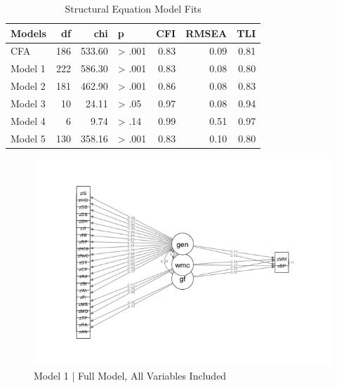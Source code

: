 \documentclass[12pt,]{book}
\begin{document}
\begin{table}[t]

\caption{\label{tab:ModelFits}Structural Equation Model Fits}
\centering
\begin{tabular}{lrrlrrr}
\toprule
Models & df & chi & p & CFI & RMSEA & TLI\\
\midrule
CFA & 186 & 533.60 & > .001 & 0.83 & 0.09 & 0.81\\
Model 1 & 222 & 586.30 & > .001 & 0.83 & 0.08 & 0.80\\
Model 2 & 181 & 462.90 & > .001 & 0.86 & 0.08 & 0.83\\
Model 3 & 10 & 24.11 & > .05 & 0.97 & 0.08 & 0.94\\
Model 4 & 6 & 9.74 & > .14 & 0.99 & 0.51 & 0.97\\
Model 5 & 130 & 358.16 & > .001 & 0.83 & 0.10 & 0.80\\
\bottomrule
\end{tabular}
\end{table}

\begin{figure}

{\centering \includegraphics[width=1\linewidth]{img/sem1} 

}

\caption{Model 1 | Full Model, All Variables Included}\label{fig:model1}
\end{figure}
\end{document}
